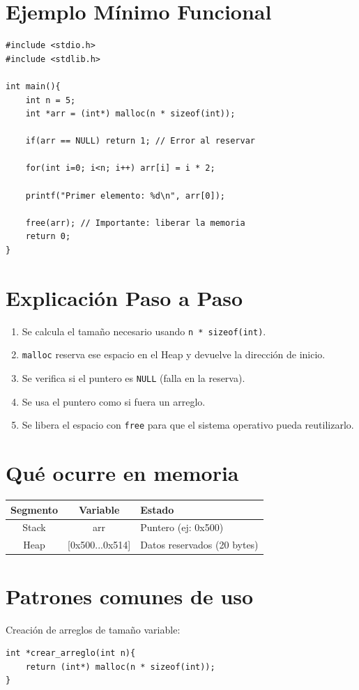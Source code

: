 \documentclass[12pt,a4paper]{article}
\begin{document}
\Needspace{9cm}
\section{Ejemplo Mínimo Funcional}
\begin{lstlisting}
#include <stdio.h>
#include <stdlib.h>

int main(){
    int n = 5;
    int *arr = (int*) malloc(n * sizeof(int));

    if(arr == NULL) return 1; // Error al reservar

    for(int i=0; i<n; i++) arr[i] = i * 2;
    
    printf("Primer elemento: %d\n", arr[0]);

    free(arr); // Importante: liberar la memoria
    return 0;
}
\end{lstlisting}

\section{Explicación Paso a Paso}
\begin{enumerate}
    \item Se calcula el tamaño necesario usando \texttt{n * sizeof(int)}.
    \item \texttt{malloc} reserva ese espacio en el Heap y devuelve la dirección de inicio.
    \item Se verifica si el puntero es \texttt{NULL} (falla en la reserva).
    \item Se usa el puntero como si fuera un arreglo.
    \item Se libera el espacio con \texttt{free} para que el sistema operativo pueda reutilizarlo.
\end{enumerate}

\section{Qué ocurre en memoria}
\begin{center}
\begin{tabular}{|c|c|l|}
\hline
\textbf{Segmento} & \textbf{Variable} & \textbf{Estado} \\ \hline
Stack & arr & Puntero (ej: 0x500) \\ \hline
Heap & [0x500...0x514] & Datos reservados (20 bytes) \\ \hline
\end{tabular}
\end{center}

\section{Patrones comunes de uso}
Creación de arreglos de tamaño variable:
\begin{lstlisting}
int *crear_arreglo(int n){
    return (int*) malloc(n * sizeof(int));
}
\end{lstlisting}
\end{document}

